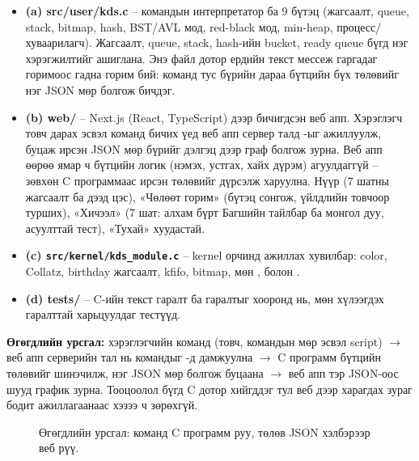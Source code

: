 \begin{itemize}[leftmargin=20pt,itemsep=2pt,topsep=2pt]
  \item \textbf{(a) src/user/kds.c} -- командын интерпретатор ба 9 бүтэц (жагсаалт, queue, stack, bitmap, hash, BST/AVL мод, red-black мод, min-heap, процесс/хуваарилагч). Жагсаалт, queue, stack, hash-ийн bucket, ready queue бүгд нэг  хэрэгжилтийг ашиглана. Энэ файл дотор ердийн текст мессеж гаргадаг горимоос гадна  горим бий: команд тус бүрийн дараа бүтцийн бүх төлөвийг нэг JSON мөр болгож бичдэг.
  \item \textbf{(b) web/} -- Next.js (React, TypeScript) дээр бичигдсэн веб апп. Хэрэглэгч товч дарах эсвэл команд бичих үед веб апп сервер талд -ыг ажиллуулж, буцаж ирсэн JSON мөр бүрийг дэлгэц дээр граф болгож зурна. Веб апп өөрөө ямар ч бүтцийн логик (нэмэх, устгах, хайх дүрэм) агуулдаггүй -- зөвхөн C программаас ирсэн төлөвийг дүрсэлж харуулна. Нүүр (7 шатны жагсаалт ба дээд цэс), «Чөлөөт горим» (бүтэц сонгож, үйлдлийн товчоор турших), «Хичээл» (7 шат: алхам бүрт Багшийн тайлбар ба монгол дуу, асуулттай тест), «Тухай» хуудастай.
  \item \textbf{(c) \texttt{src/kernel/kds\_module.c}} -- kernel орчинд ажиллах хувилбар: color, Collatz, birthday жагсаалт, kfifo, bitmap, мөн ,  болон .
  \item \textbf{(d) tests/} -- C-ийн текст гаралт ба  гаралтыг хооронд нь, мөн хүлээгдэх гаралттай харьцуулдаг тестүүд.
\end{itemize}

\textbf{Өгөгдлийн урсгал:} хэрэглэгчийн команд (товч, командын мөр эсвэл script) $\rightarrow$ веб апп серверийн тал нь командыг -д дамжуулна $\rightarrow$ C программ бүтцийн төлөвийг шинэчилж, нэг JSON мөр болгож буцаана $\rightarrow$ веб апп тэр JSON-оос шууд график зурна. Тооцоолол бүгд C дотор хийгддэг тул веб дээр харагдах зураг бодит ажиллагаанаас хэзээ ч зөрөхгүй.

\begin{figure}[H]
\centering
{}
\caption*{Өгөгдлийн урсгал: команд C программ руу, төлөв JSON хэлбэрээр веб рүү.}
\end{figure}

